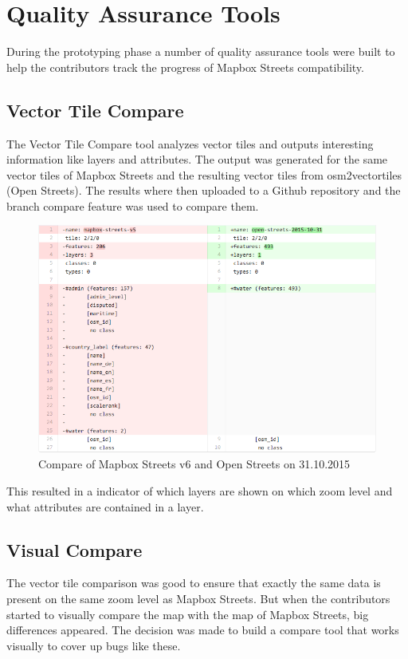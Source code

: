 \section{Quality Assurance Tools}\label{tools}
During the prototyping phase a number of quality assurance tools were built to help the contributors track the progress of Mapbox Streets compatibility.

\subsection{Vector Tile Compare}\label{vector_tile_compare}
The Vector Tile Compare tool analyzes vector tiles and outputs interesting information like layers and attributes. 
The output was generated for the same vector tiles of Mapbox Streets and the resulting vector tiles from osm2vectortiles (Open Streets).
The results where then uploaded  to a Github repository and the branch compare feature was used to compare them. 

\begin{figure}[H]
  \centering
  \includegraphics[width=1\textwidth]{images/vector_tile_compare.png}
  \caption{Compare of Mapbox Streets v6 and Open Streets on 31.10.2015}
\end{figure}

This resulted in a indicator of which layers are shown on which zoom level and what attributes are contained in a layer.

\subsection{Visual Compare}\label{visual_compare}
The vector tile comparison was good to ensure that exactly the same data is present on the same zoom level as Mapbox Streets.
But when the contributors started to visually compare the map with the map of Mapbox Streets, big differences appeared.
The decision was made to build a compare tool that works visually to cover up bugs like these.

